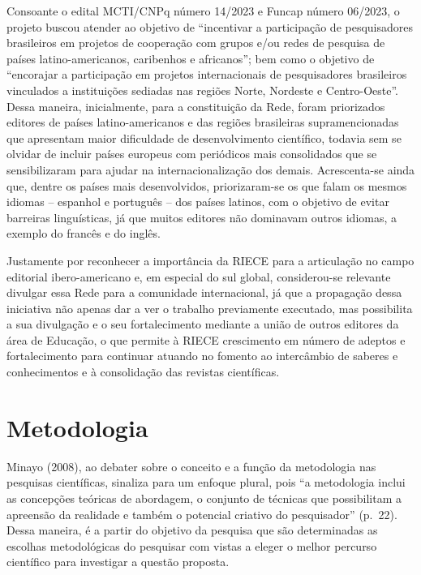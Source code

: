 \documentclass[
  a4paper,
]{book}
\begin{document}
Consoante o edital MCTI/CNPq número 14/2023 e Funcap número 06/2023, o
projeto buscou atender ao objetivo de ``incentivar a participação de
pesquisadores brasileiros em projetos de cooperação com grupos e/ou
redes de pesquisa de países latino-americanos, caribenhos e africanos'';
bem como o objetivo de ``encorajar a participação em projetos
internacionais de pesquisadores brasileiros vinculados a instituições
sediadas nas regiões Norte, Nordeste e Centro-Oeste''. Dessa maneira,
inicialmente, para a constituição da Rede, foram priorizados editores de
países latino-americanos e das regiões brasileiras supramencionadas que
apresentam maior dificuldade de desenvolvimento científico, todavia sem
se olvidar de incluir países europeus com periódicos mais consolidados
que se sensibilizaram para ajudar na internacionalização dos demais.
Acrescenta-se ainda que, dentre os países mais desenvolvidos,
priorizaram-se os que falam os mesmos idiomas -- espanhol e português --
dos países latinos, com o objetivo de evitar barreiras linguísticas, já
que muitos editores não dominavam outros idiomas, a exemplo do francês e
do inglês.

Justamente por reconhecer a importância da RIECE para a articulação no
campo editorial ibero-americano e, em especial do sul global,
considerou-se relevante divulgar essa Rede para a comunidade
internacional, já que a propagação dessa iniciativa não apenas dar a ver
o trabalho previamente executado, mas possibilita a sua divulgação e o
seu fortalecimento mediante a união de outros editores da área de
Educação, o que permite à RIECE crescimento em número de adeptos e
fortalecimento para continuar atuando no fomento ao intercâmbio de
saberes e conhecimentos e à consolidação das revistas científicas.

\section{Metodologia}\label{metodologia}

Minayo (2008), ao debater sobre o conceito e a função da metodologia nas
pesquisas científicas, sinaliza para um enfoque plural, pois ``a
metodologia inclui as concepções teóricas de abordagem, o conjunto de
técnicas que possibilitam a apreensão da realidade e também o potencial
criativo do pesquisador'' (p.~22). Dessa maneira, é a partir do objetivo
da pesquisa que são determinadas as escolhas metodológicas do pesquisar
com vistas a eleger o melhor percurso científico para investigar a
questão proposta.
\end{document}
